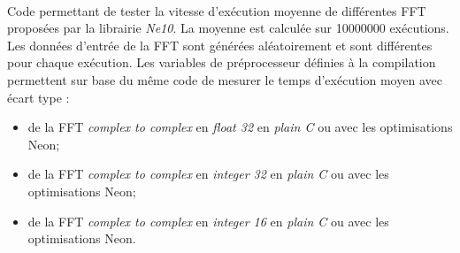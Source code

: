 \documentclass{article}
\begin{document}
\paragraph{}
Code permettant de tester la vitesse d'exécution moyenne de différentes FFT proposées par la librairie \emph{Ne10}. La moyenne est calculée sur \SI{10000000}{} exécutions. Les données d'entrée de la FFT sont générées aléatoirement et sont différentes pour chaque exécution. Les variables de préprocesseur définies à la compilation permettent sur base du même code de mesurer le temps d'exécution moyen avec écart type :
\begin{itemize}
    \item de la FFT \emph{complex to complex} en \emph{float 32} en \emph{plain C} ou avec les optimisations Neon;
    \item de la FFT \emph{complex to complex} en \emph{integer 32} en \emph{plain C} ou avec les optimisations Neon;
    \item de la FFT \emph{complex to complex} en \emph{integer 16} en \emph{plain C} ou avec les optimisations Neon.
\end{itemize}
\lstset{language=C++}
\end{document}
